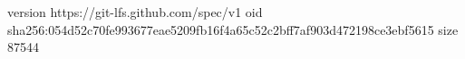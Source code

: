 version https://git-lfs.github.com/spec/v1
oid sha256:054d52c70fe993677eae5209fb16f4a65c52c2bff7af903d472198ce3ebf5615
size 87544
